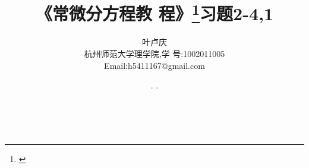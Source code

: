 \documentclass[a4paper, 12pt]{article} %
\makeatletter
\renewcommand{\maketitle}{ %
  \renewcommand\refname{参考文献}
  \newcommand{\D}{\displaystyle}\newcommand{\ri}{\Rightarrow}
  \newcommand{\ds}{\displaystyle} \renewcommand{\ni}{\noindent}
  \newcommand{\pa}{\partial} \newcommand{\Om}{\Omega}
  \newcommand{\om}{\omega} \newcommand{\sik}{\sum_{i=1}^k}
  \newcommand{\vov}{\Vert\omega\Vert} \newcommand{\Umy}{U_{\mu_i,y^i}}
  \newcommand{\lamns}{\lambda_n^{^{\scriptstyle\sigma}}}
  \newcommand{\chiomn}{\chi_{_{\Omega_n}}}
  \newcommand{\ullim}{\underline{\lim}} \newcommand{\bsy}{\boldsymbol}
  \newcommand{\mvb}{\mathversion{bold}} \newcommand{\la}{\lambda}
  \newcommand{\La}{\Lambda} \newcommand{\va}{\varepsilon}
  \newcommand{\be}{\beta} \newcommand{\al}{\alpha}
  \newcommand{\dis}{\displaystyle} \newcommand{\R}{{\mathbb R}}
  \newcommand{\N}{{\mathbb N}} \newcommand{\cF}{{\mathcal F}}
  \newcommand{\gB}{{\mathfrak B}} \newcommand{\eps}{\epsilon}
  \begin{flushright} %
    {\LARGE\@title} %
    
    \vspace{50pt} %
    
    {\large\@author} %
    \\\@date %
    
    \vspace{40pt} %
  \end{flushright}
}
\makeatother
\begin{document}
\begin{CJK}{UTF8}{gkai}
  \title{\textbf{《常微分方程教
      程》\footnote{\cite{dinglichang}}习题2-4,1}}
  \author{\small{叶卢庆}\\{\small{杭州师范大学理学院,学
        号:1002011005}}\\{\small{Email:h5411167@gmail.com}}} %
  \renewcommand{\today}{\number\year. \number\month. \number\day}
  \date{\today} %
  
  
  
  \maketitle %
  
  
  
  
  
  
  

\end{CJK}
\end{document}
